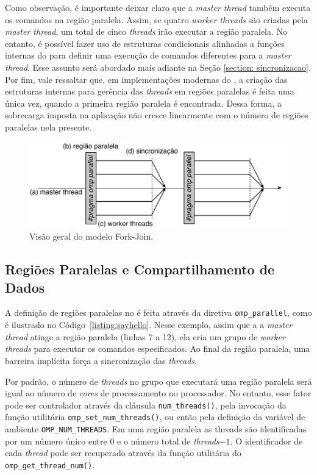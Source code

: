 \documentclass{SBCbookchapter}
\begin{document}
		Como observação, é importante deixar claro que a \textit{master
		thread} também executa os comandos na região paralela. Assim, se
		quatro \textit{worker threads} são criadas pela \textit{master
		thread}, um total de cinco \textit{threads} irão executar a região paralela.
		No entanto, é possível fazer uso de estruturas condicionais
		alinhadas a funções internas do \openmp para definir uma execução de
		comandos diferentes para a \textit{master thread}. Esse assunto será
		abordado mais adiante na Seção \ref{section: sincronizacao}. Por
		fim, vale ressaltar que, em implementações modernas do \openmp, a
		criação das estruturas internas para gerência das \textit{threads} em regiões
		paralelas é feita uma única vez, quando a primeira região paralela é
		encontrada. Dessa forma, a sobrecarga imposta na aplicação não
		cresce linearmente com o número de regiões paralelas nela presente.

			\begin{figure}[t]
				\centering
				\includegraphics[width=0.8\linewidth]{img/fork-join}
				\caption{Visão geral do modelo Fork-Join.}\label{fig:fork-join}
			\end{figure}

	\subsection{Regiões Paralelas e Compartilhamento de Dados}

		A definição de regiões paralelas no \openmp é feita através da
		diretiva \texttt{omp\_parallel}, como é ilustrado no Código~\ref{listing:sayhello}.
		Nesse exemplo, assim que a a \textit{master thread}
		atinge a região paralela (linhas 7 a 12), ela cria um grupo de
		\textit{worker threads} para executar os comandos especificados. Ao
		final da região paralela, uma barreira implícita força a
		sincronização das \textit{threads}.
		
		Por padrão, o número de \textit{threads} no grupo que executará uma região
		paralela será igual ao número de \textit{cores} de processamento no
		processador. No entanto, esse fator pode ser controlador através da
		cláusula \texttt{num\_threads()}, pela invocação da função
		utilitária \texttt{omp\_set\_num\_threads()}, ou então pela
		definição da variável de ambiente \texttt{OMP\_NUM\_THREADS}. Em uma região paralela
		as threads são identificadas por um número único entre $0$ e o número total de \textit{threads}$-1$.
		O identificador de cada \textit{thread} pode ser recuperado através da
		função utilitária do \openmp \texttt{omp\_get\_thread\_num()}.
\end{document}
